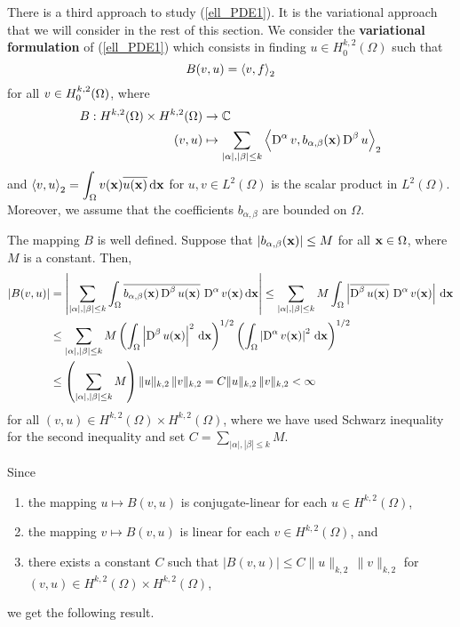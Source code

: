 There is a third approach to study (\ref{ell_PDE1}).  It is the
variational approach that we will consider in the rest of this
section.  We consider the {\bfseries variational formulation} of
(\ref{ell_PDE1}) which consists in finding
$\displaystyle u\in H^{k,2}_0(\Omega)$ such that
\begin{equation} \label{ell_PDE2}
B(v,u) = \left\langle{v} , {f}\right\rangle_2
\end{equation}
for all $\displaystyle \displaystyle v \in H^{k,2}_0(\Omega)$, where
\begin{equation} \label{ell_PDE3}
\begin{split}
B : H^{k,2}(\Omega) \times H^{k,2}(\Omega) & \rightarrow \mathbb{C} \\
(v,u) &\mapsto
\sum_{|\alpha|,|\beta|\leq k}
\left\langle{\operatorname{D}^\alpha v} , {b_{\alpha,\beta}(\mathbf{x}) \operatorname{D}^\beta u}\right\rangle_2
\end{split}
\end{equation}
and $\displaystyle \left\langle{v} , {u}\right\rangle_2
= \int_\Omega v(\mathbf{x})\overline{u(\mathbf{x})} \,\mathrm{d}{\mathbf{x}}$
for $\displaystyle u,v \in L^2(\Omega)$ is the scalar product in
$\displaystyle L^2(\Omega)$.  Moreover, we assume that the
coefficients $b_{\alpha,\beta}$ are bounded on $\Omega$.

The mapping $B$ is well defined.  Suppose that
$\left| b_{\alpha,\beta}(\mathbf{x})\right| \leq M$ for all 
$\mathbf{x}\in \Omega$, where $M$ is a constant.  Then,
\begin{align*}
\left| B(v,u) \right| &=
\left| \sum_{|\alpha|,|\beta|\leq k}
\int_\Omega \overline{b_{\alpha,\beta}(\mathbf{x}) \operatorname{D}^\beta u(\mathbf{x})}\,
\operatorname{D}^\alpha v(\mathbf{x}) \,\mathrm{d}{\mathbf{x}} \right|
\leq \sum_{|\alpha|,|\beta|\leq k} M
\int_\Omega \left| \overline{\operatorname{D}^\beta u(\mathbf{x})}\,
\operatorname{D}^\alpha v(\mathbf{x})\right| \,\mathrm{d}{\mathbf{x}} \\
&\leq \sum_{|\alpha|,|\beta|\leq k} M
\left( \int_\Omega \left|\operatorname{D}^\beta u(\mathbf{x})\right|^2
\,\mathrm{d}{\mathbf{x}}\right)^{1/2}
\left( \int_\Omega \left|\operatorname{D}^\alpha v(\mathbf{x})\right|^2
\,\mathrm{d}{\mathbf{x}}\right)^{1/2} \\
&\leq \left(\sum_{|\alpha|,|\beta|\leq k} M \right)
\| u\|_{k,2}\, \| v\|_{k,2}
= C \| u\|_{k,2} \, \| v\|_{k,2} < \infty
\end{align*}
for all $\displaystyle (v,u) \in H^{k,2}(\Omega) \times H^{k,2}(\Omega)$,
where we have used Schwarz inequality for the second inequality and
set $\displaystyle C = \sum_{|\alpha|,|\beta|\leq k} M $.

Since
\begin{enumerate}
\item the mapping $u \mapsto B(v,u)$ is conjugate-linear for each
$u\in H^{k,2}(\Omega)$,
\item the mapping $v \mapsto B(v,u)$ is linear for each
$v\in H^{k,2}(\Omega)$, and
\item there exists a constant $C$ such that
$\displaystyle \left| B(v,u) \right| \leq C \| u\|_{k,2} \, \| v\|_{k,2}$
for $(v,u) \in H^{k,2}(\Omega) \times H^{k,2}(\Omega)$,
\end{enumerate}
we get the following result.

